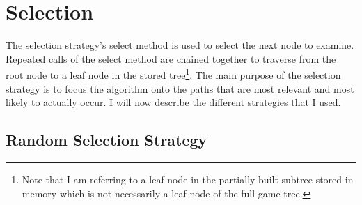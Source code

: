 








\section{Selection}								%



The selection strategy's select method is used to select the next node to examine. Repeated calls of the select method are chained together to traverse from the root node to a leaf node in the stored tree\footnote{Note that I am referring to a leaf node in the partially built subtree stored in memory which is not necessarily a leaf node of the full game tree.}. The main purpose of the selection strategy is to focus the algorithm onto the paths that are most relevant and most likely to actually occur. I will now describe the different strategies that I used.


\subsection{Random Selection Strategy}				%

